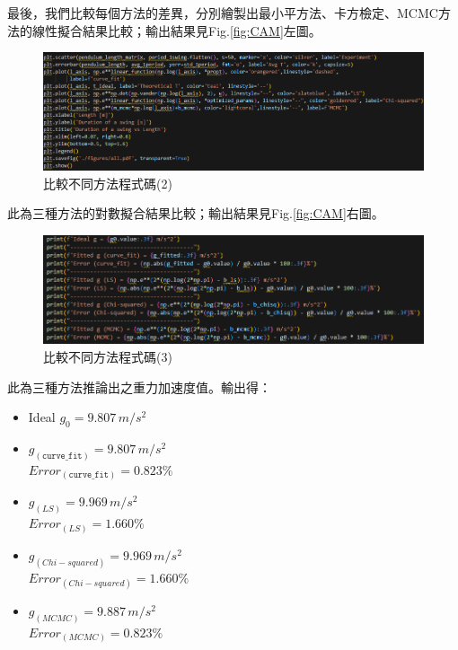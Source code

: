 \documentclass[12pt,a4paper]{article}
\begin{document}
\begin{CJK}{UTF8}{bkai}
\indent 最後，我們比較每個方法的差異，分別繪製出最小平方法、卡方檢定、MCMC方法的線性擬合結果比較；輸出結果見Fig.\ref{fig:CAM}左圖。

\begin{figure}[h]
    \centering
    \includegraphics[width=1\linewidth]{CAM2.png}
    \caption{比較不同方法\-程式碼(2)}
    \label{fig:CAM2}
\end{figure}

\indent 此為三種方法的對數擬合結果比較；輸出結果見Fig.\ref{fig:CAM}右圖。

\clearpage

\begin{figure}[h]
    \centering
    \includegraphics[width=1\linewidth]{CAM3.png}
    \caption{比較不同方法\-程式碼(3)}
    \label{fig:CAM3}
\end{figure}

\indent 此為三種方法推論出之重力加速度值。輸出得：\\
\begin{itemize}
    \item Ideal $g_0 = 9.807 \,m/s^2$
    \item $g_{(\texttt{curve\_fit})} = 9.807 \,m/s^2$\\$Error _{(\texttt{curve\_fit})} = 0.823\%$
    \item $g_{(LS)} = 9.969 \,m/s^2$\\$Error_{(LS)} = 1.660\%$
    \item $g_{(Chi-squared)} = 9.969 \,m/s^2$\\$Error _{(Chi-squared)} = 1.660\%$
    \item $g_{(MCMC)} = 9.887 \,m/s^2$\\$Error_{(MCMC)} = 0.823\%$
\end{itemize}


\end{CJK}
\end{document}
